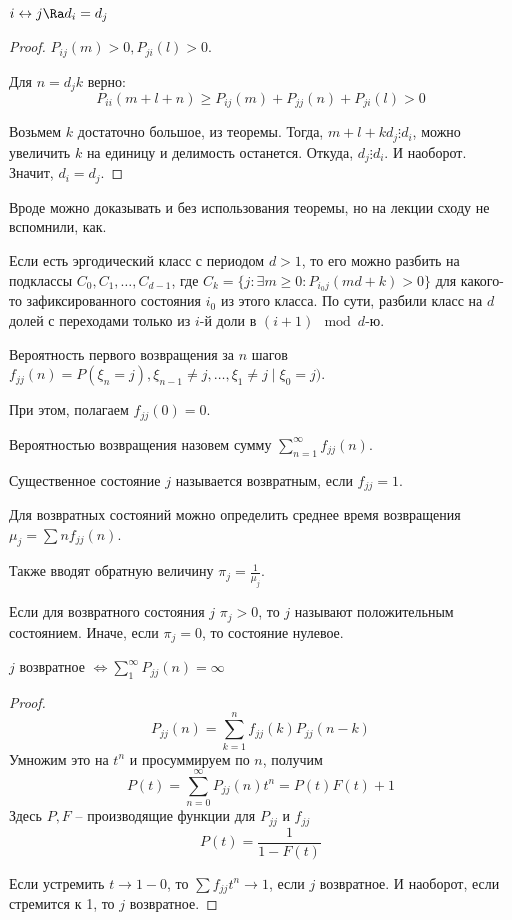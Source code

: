 \begin{assertion}
$i \leftrightarrow j \Ra d_i = d_j$
\end{assertion}
\begin{proof}
$P_{ij}(m) > 0, P_{ji}(l) > 0$.

Для $n = d_jk$ верно: $$P_{ii}(m + l + n) \geq P_{ij}(m) + P_{jj}(n) + P_{ji}(l) > 0$$

Возьмем $k$ достаточно большое, из теоремы.
Тогда, $m + l + k d_j \vdots d_i$, можно увеличить $k$ на единицу и делимость останется. 
Откуда, $d_j \vdots d_i$. И наоборот. Значит, $d_i = d_j$.
\end{proof}
\begin{Rem}
Вроде можно доказывать и без использования теоремы, но на лекции сходу не вспомнили, как.
\end{Rem}

Если есть эргодический класс с периодом $d > 1$, то его можно разбить на подклассы $C_0, C_1, \dots, C_{d - 1}$, где $C_k = \{j \colon \exists m \geq 0 \colon P_{i_0j}(md + k) > 0\}$
для какого-то зафиксированного состояния $i_0$ из этого класса.
По сути, разбили класс на $d$ долей с переходами только из $i$-й доли в $(i + 1) \mod d$-ю.

\begin{Def}

Вероятность первого возвращения за $n$ шагов $f_{jj}(n) = P(\xi_n = j), \xi_{n-1} \neq j, \dots, \xi_1 \neq j \mid \xi_0 = j)$.

При этом, полагаем $f_{jj}(0) = 0$.

Вероятностью возвращения назовем сумму $\sum\limits_{n=1}^\infty f_{jj}(n)$.

\end{Def}

\begin{Def}
Существенное состояние $j$ называется возвратным, если $f_{jj} = 1$.
\end{Def}

\begin{Def}
Для возвратных состояний можно определить среднее время возвращения $\mu_j = \sum n f_{jj}(n)$. 

Также вводят обратную величину $\pi_j = \frac{1}{\mu_j}$. 

Если для возвратного состояния $j$ $\pi_j > 0$, то $j$ называют положительным состоянием. 
Иначе, если $\pi_j = 0$, то состояние нулевое.
\end{Def}

\begin{theorem}
$j$ возвратное $\Leftrightarrow \sum\limits_1^\infty P_{jj}(n) = \infty$
\end{theorem}
\begin{proof}
$$P_{jj}(n) = \sum\limits_{k=1}^n f_{jj}(k) P_{jj}(n - k)$$
Умножим это на $t^n$ и просуммируем по $n$, получим
$$P(t) = \sum\limits_{n=0}^\infty P_{jj}(n) t^n = P(t) F(t) + 1$$
Здесь $P, F$ -- производящие функции для $P_{jj}$ и $f_{jj}$
$$P(t) = \frac{1}{1 - F(t)}$$

Если устремить $t \to 1-0$, то $\sum f_{jj}t^n \to 1$, если $j$ возвратное.
И наоборот, если стремится к 1, то $j$ возвратное.
\end{proof}
